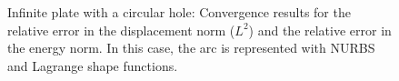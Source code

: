     \begin{figure}
        \centering
        \caption{
            Infinite plate with a circular hole: Convergence results for the relative error in the displacement norm ($L^2$) and
                the relative error in the energy norm. In this case, the arc is represented with NURBS and Lagrange shape functions.
        }
        \label{fig:circular_hole_shape_function_convergence}
    \end{figure}

\pagebreak